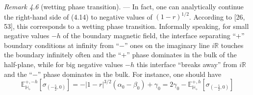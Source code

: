 \documentclass[11pt]{article}
\theoremstyle{plain}
\newcommand{\E}{\mathbb{E}}
\newcommand{\Hb}{\mathbb{H}}
\newcommand{\diamondH}{\Hb_{\diamond}}
\begin{document}
\medskip
\noindent\emph{Remark 4.6} (wetting phase transition). --- In fact, one can analytically continue the
right-hand side of (4.14) to negative values of $(1-r)^{1/2}$. According to [26, 53], this corresponds to a
wetting phase transition. Informally speaking, for small negative values $-h$ of the boundary magnetic field,
the interface separating ``$+$'' boundary conditions at infinity from ``$-$'' ones on the imaginary line
$i\mathbb{R}$ touches the boundary infinitely often and the ``$+$'' phase dominates in the bulk of the
half-plane, while for big negative values $-h$ this interface ``breaks away'' from $i\mathbb{R}$ and the
``$-$'' phase dominates in the bulk. For instance, one should have
\[
\E^{+,-h}_{\diamondH}\left[\sigma_{\left(-\frac{5}{2},0\right)}\right]
= -|1-r|^{3/2}(\alpha_0-\beta_0) + \gamma_0
= 2\gamma_0 - \E^{+,h}_{\diamondH}\left[\sigma_{\left(-\frac{5}{2},0\right)}\right]
\]

\end{document}

